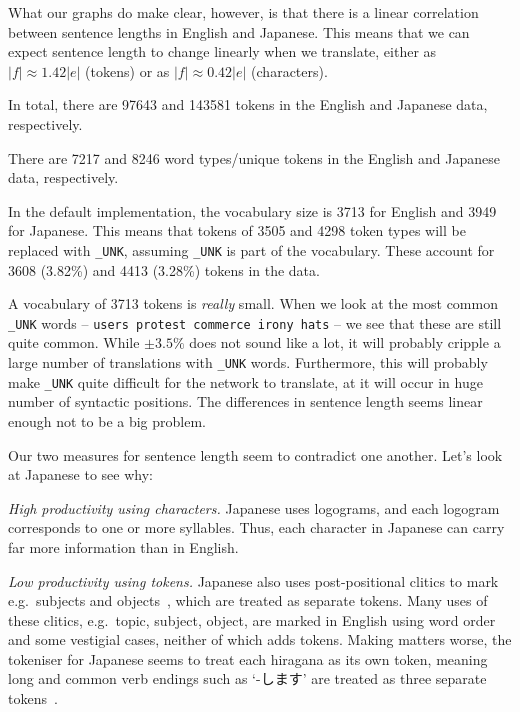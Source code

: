 \documentclass[answers]{exam}
\begin{document}
\begin{CJK}{UTF8}{min}
\begin{questions}
\begin{framed}
\begin{compactenum}[1.]
    What our graphs do make clear, however, is that there is a linear
    correlation between sentence lengths in English and Japanese. This means
    that we can expect sentence length to change linearly when we translate,
    either as $|f| \approx 1.42|e|$ (tokens) or as $|f| \approx 0.42|e|$
    (characters).
  \item
    In total, there are 97643 and 143581 tokens in the English and Japanese
    data, respectively.
  \item
    There are 7217 and 8246 word types/unique tokens in the English and Japanese
    data, respectively.
  \item
    In the default implementation, the vocabulary size is 3713 for English and
    3949 for Japanese. This means that tokens of 3505 and 4298 token types will
    be replaced with \texttt{\_UNK}, assuming \texttt{\_UNK} is part of the
    vocabulary. These account for 3608 (3.82\%) and 4413 (3.28\%) tokens in the
    data.
  \item
    A vocabulary of 3713 tokens is \emph{really} small. When we look at the most
    common \texttt{\_UNK} words -- \texttt{users protest commerce irony hats} --
    we see that these are still quite common. While $\pm 3.5\%$ does not sound
    like a lot, it will probably cripple a large number of translations with
    \texttt{\_UNK} words. Furthermore, this will probably make \texttt{\_UNK}
    quite difficult for the network to translate, at it will occur in huge
    number of syntactic positions.
    The differences in sentence length seems linear enough not to be a big
    problem.
  \end{compactenum}
\end{framed}


\begin{framed}
  Our two measures for sentence length seem to contradict one another. Let's
  look at Japanese to see why:
  \begin{compactitem}
  \item {\it High productivity using characters.}
    Japanese uses logograms, and each logogram corresponds to one or more
    syllables. Thus, each character in Japanese can carry far more information
    than in English.
  \item {\it Low productivity using tokens.}
    Japanese also uses post-positional clitics to mark e.g.\ subjects and
    objects~\citep{Hinds-1986}, which are treated as separate tokens.
    Many uses of these clitics, e.g.\ topic, subject, object, are marked in
    English using word order and some vestigial cases, neither of which adds
    tokens.
    Making matters worse, the tokeniser for Japanese seems to treat each
    hiragana as its own token, meaning long and common verb endings such as
    `-します' are treated as three separate
    tokens~\citep{Minna-1998}.
  \end{compactitem}
\end{framed}



\end{questions}
\end{CJK}
\end{document}
